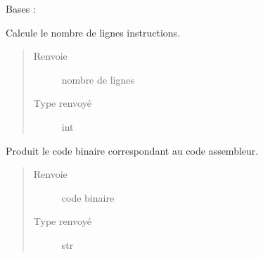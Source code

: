 \documentclass[letterpaper,10pt,french]{sphinxmanual}
\begin{document}
\begin{fulllineitems}
\label{\detokenize{assembleurcontainer:assembleurcontainer.AssembleurContainer}}
Bases : 

\begin{fulllineitems}
\label{\detokenize{assembleurcontainer:assembleurcontainer.AssembleurContainer.getAsmSize}}
Calcule le nombre de lignes instructions.
\begin{quote}\begin{description}
\item[{Renvoie}] \leavevmode
nombre de lignes

\item[{Type renvoyé}] \leavevmode
int

\end{description}\end{quote}

\end{fulllineitems}


\begin{fulllineitems}
\label{\detokenize{assembleurcontainer:assembleurcontainer.AssembleurContainer.getBinary}}
Produit le code binaire correspondant au code assembleur.
\begin{quote}\begin{description}
\item[{Renvoie}] \leavevmode
code binaire

\item[{Type renvoyé}] \leavevmode
str

\end{description}\end{quote}

\end{fulllineitems}


\end{fulllineitems}
\end{document}
